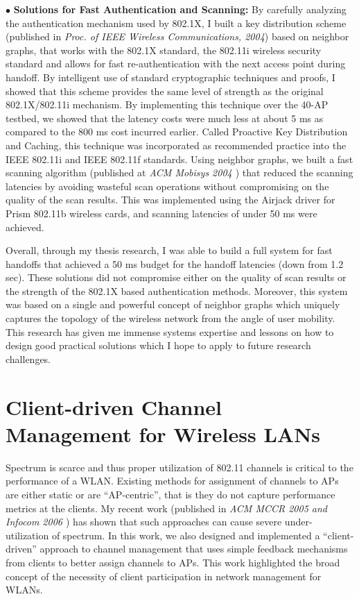 \documentclass[11pt,letterpaper]{article}
\begin{document}
$\bullet$  {\bf Solutions for Fast Authentication and Scanning:} By carefully analyzing the authentication mechanism
used by 802.1X, I built a key distribution scheme (published in {\it Proc. of IEEE Wireless Communications, 2004}) based
on neighbor graphs, that works with the 802.1X standard, the 802.11i wireless security standard and allows for fast
re-authentication with the next access point during handoff. By intelligent use of standard cryptographic techniques and
proofs, I showed that this scheme provides the same level of strength as the original 802.1X/802.11i mechanism. By
implementing this technique over the 40-AP testbed, we showed that the latency costs were much less at about 5 ms as
compared to the 800 ms cost incurred earlier. Called Proactive Key Distribution and Caching, this technique was
incorporated as recommended practice into the IEEE 802.11i and IEEE 802.11f standards.  Using neighbor graphs, we built
a fast scanning algorithm (published at {\it ACM Mobisys 2004 \cite{shin2004}}) that reduced the scanning latencies by
avoiding wasteful scan operations without compromising on the quality of the scan results. This was implemented using
the Airjack driver for Prism  802.11b wireless cards, and scanning latencies of under 50 ms were achieved. 

Overall, through my thesis research, I was able to build a full system for fast handoffs that achieved a 50 ms budget
for the handoff latencies (down from 1.2 sec). These solutions did not compromise either on the quality of scan results
or the strength of the 802.1X based authentication methods. Moreover, this system was based on a single and powerful
concept of neighbor graphs which uniquely captures the topology of the wireless network from the angle of user mobility.
This research has given me immense systems expertise and lessons on how to design good practical solutions which I hope
to apply to future research challenges.



\section{Client-driven Channel Management for Wireless LANs} Spectrum is scarce and thus proper utilization of 802.11
channels is critical to the performance of a WLAN. Existing methods for assignment of channels to APs are either static
or are ``AP-centric'', that is they do not capture performance metrics at the clients. My recent work (published 
in {\it ACM MCCR 2005 \cite{graph2005} and Infocom 2006 \cite{infocom2006}}) has shown that such approaches can cause severe
under-utilization of spectrum. In this work, we also designed and implemented a ``client-driven'' approach to channel
management  that uses simple feedback mechanisms from clients to better assign channels to APs. This work highlighted
the broad concept of the necessity of client participation in network management for WLANs.
\end{document}
